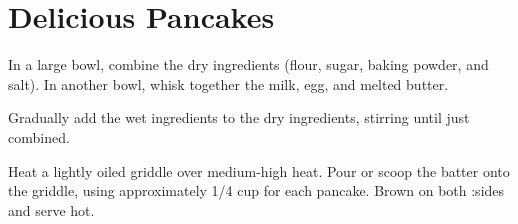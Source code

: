 \chapter{Delicious Pancakes}



\noindent
In a large bowl, combine the dry ingredients (flour, sugar, baking powder, and salt). In another bowl, whisk together the milk, egg, and melted butter.

Gradually add the wet ingredients to the dry ingredients, stirring until just combined.

Heat a lightly oiled griddle over medium-high heat. Pour or scoop the batter onto the griddle, using approximately 1/4 cup for each pancake. Brown on both :sides and serve hot.

